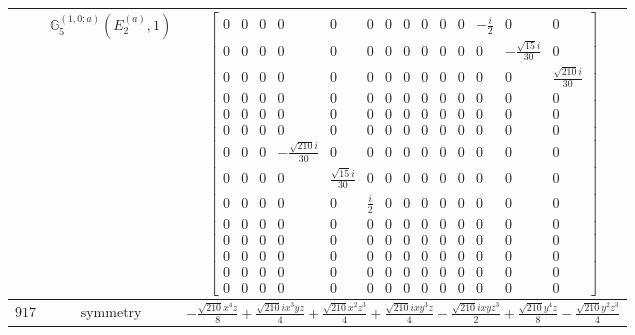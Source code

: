 \documentclass[fleqn,8pt,landscape]{jsarticle}
\begin{document}
\begin{longtable}{ccc}
$  $ & $ \mathbb{G}_{5}^{(1,0;a)}(E_{2}^{(a)},1) $ & $ \begin{bmatrix} 0 & 0 & 0 & 0 & 0 & 0 & 0 & 0 & 0 & 0 & 0 & - \frac{i}{2} & 0 & 0 \\ 0 & 0 & 0 & 0 & 0 & 0 & 0 & 0 & 0 & 0 & 0 & 0 & - \frac{\sqrt{15} i}{30} & 0 \\ 0 & 0 & 0 & 0 & 0 & 0 & 0 & 0 & 0 & 0 & 0 & 0 & 0 & \frac{\sqrt{210} i}{30} \\ 0 & 0 & 0 & 0 & 0 & 0 & 0 & 0 & 0 & 0 & 0 & 0 & 0 & 0 \\ 0 & 0 & 0 & 0 & 0 & 0 & 0 & 0 & 0 & 0 & 0 & 0 & 0 & 0 \\ 0 & 0 & 0 & 0 & 0 & 0 & 0 & 0 & 0 & 0 & 0 & 0 & 0 & 0 \\ 0 & 0 & 0 & - \frac{\sqrt{210} i}{30} & 0 & 0 & 0 & 0 & 0 & 0 & 0 & 0 & 0 & 0 \\ 0 & 0 & 0 & 0 & \frac{\sqrt{15} i}{30} & 0 & 0 & 0 & 0 & 0 & 0 & 0 & 0 & 0 \\ 0 & 0 & 0 & 0 & 0 & \frac{i}{2} & 0 & 0 & 0 & 0 & 0 & 0 & 0 & 0 \\ 0 & 0 & 0 & 0 & 0 & 0 & 0 & 0 & 0 & 0 & 0 & 0 & 0 & 0 \\ 0 & 0 & 0 & 0 & 0 & 0 & 0 & 0 & 0 & 0 & 0 & 0 & 0 & 0 \\ 0 & 0 & 0 & 0 & 0 & 0 & 0 & 0 & 0 & 0 & 0 & 0 & 0 & 0 \\ 0 & 0 & 0 & 0 & 0 & 0 & 0 & 0 & 0 & 0 & 0 & 0 & 0 & 0 \\ 0 & 0 & 0 & 0 & 0 & 0 & 0 & 0 & 0 & 0 & 0 & 0 & 0 & 0 \end{bmatrix} $ \\ \hline
$ 917 $ & $ \text{symmetry} $ & $ - \frac{\sqrt{210} x^{4} z}{8} + \frac{\sqrt{210} i x^{3} y z}{4} + \frac{\sqrt{210} x^{2} z^{3}}{4} + \frac{\sqrt{210} i x y^{3} z}{4} - \frac{\sqrt{210} i x y z^{3}}{2} + \frac{\sqrt{210} y^{4} z}{8} - \frac{\sqrt{210} y^{2} z^{3}}{4} $ \\

\end{longtable}
\end{document}
